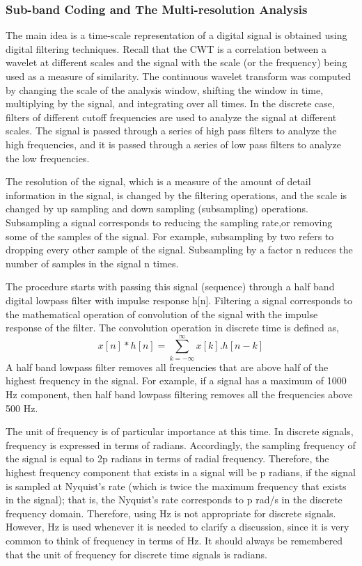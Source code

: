 \documentclass[12pt, a4paper, twoside]{report}
\begin{document}
\subsubsection{Sub-band Coding and The Multi-resolution Analysis}
The main idea is a time-scale representation of a digital signal is obtained using digital filtering techniques. Recall that the CWT is a correlation between a wavelet at different scales and the signal with the scale (or the frequency) being used as a measure of similarity. The continuous wavelet transform was computed by changing the scale of the analysis window, shifting the window in time, multiplying by the signal, and integrating over all times. In the discrete case, filters of different cutoff frequencies are used to analyze the signal at different scales. The signal is passed through a series of high pass filters to analyze the high frequencies, and it is passed through a series of low pass filters to analyze the low frequencies. 
\par
The resolution of the signal, which is a measure of the amount of detail information in the signal, is changed by the filtering operations, and the scale is changed by up sampling and down sampling (subsampling) operations. Subsampling a signal corresponds to reducing the sampling rate,or removing some of the samples of the signal. For example, subsampling by two refers to dropping every other sample of the signal. Subsampling by a factor n reduces the number of samples in the signal n times.
\par
The procedure starts with passing this signal (sequence) through a half band digital lowpass filter with impulse response h[n]. Filtering a signal corresponds to the mathematical operation of convolution of the signal with the impulse response of the filter. The convolution operation in discrete time is defined as,
\begin{equation*}
x[n]*h[n] = \sum_{k=-\infty}^{\infty} x[k].h[n-k]
\end{equation*}
A half band lowpass filter removes all frequencies that are above half of the highest frequency in the signal. For example, if a signal has a maximum of 1000 Hz component, then half band lowpass filtering removes all the frequencies above 500 Hz.
\par
The unit of frequency is of particular importance at this time. In discrete signals, frequency is expressed in terms of radians. Accordingly, the sampling frequency of the signal is equal to 2p radians in terms of radial frequency. Therefore, the highest frequency component that exists in a signal will be p radians, if the signal is sampled at Nyquist’s rate (which is twice the maximum frequency that exists in the signal); that is, the Nyquist’s rate corresponds to p rad/s in the discrete frequency domain. Therefore, using Hz is not appropriate for discrete signals. However, Hz is used whenever it is needed to clarify a discussion, since it is very common to think of frequency in terms of Hz. It should always be remembered that the unit of frequency for discrete time signals is radians.
\end{document}
